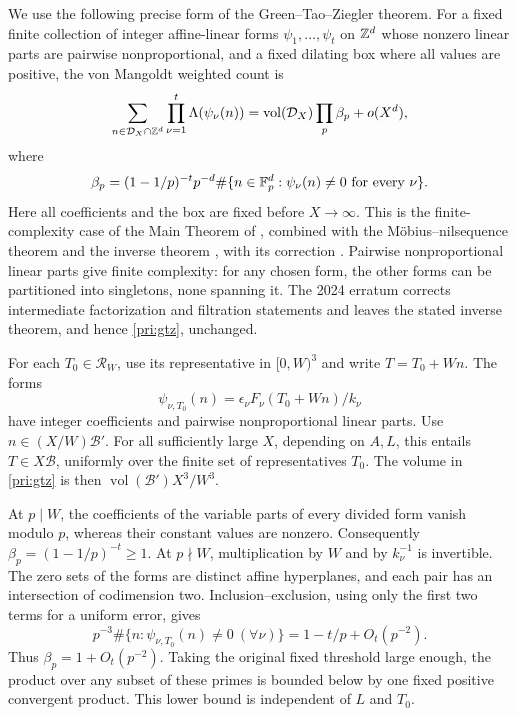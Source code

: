 We use the following precise form of the Green--Tao--Ziegler theorem.
For a fixed finite collection of integer affine-linear forms
$\psi_1,\ldots,\psi_t$ on $\mathbb Z^d$ whose nonzero linear parts are pairwise
nonproportional, and a fixed dilating box where all values are positive,
the von Mangoldt weighted count is
\begin{equation}\label{pri:gtz}
 \sum_{n\in\mathcal D_X\cap\mathbb Z^d}\prod_{\nu=1}^t\Lambda(\psi_\nu(n))
 =\operatorname{vol}(\mathcal D_X)\prod_p\beta_p+o(X^d),
\end{equation}
where
\[
 \beta_p=(1-1/p)^{-t}p^{-d}
   \#\{n\in\mathbb F_p^d:\psi_\nu(n)\ne0\text{ for every }\nu\}.
\]
Here all coefficients and the box are fixed before $X\to\infty$.
This is the finite-complexity case of the Main Theorem of
\cite{GreenTao2010}, combined with the M\"obius--nilsequence theorem
\cite[Theorem 1.1]{GreenTao2012} and the inverse theorem
\cite[Theorem 1.3]{GreenTaoZiegler2012}, with its correction
\cite{GreenTaoZiegler2024Erratum}.  Pairwise nonproportional linear parts
give finite complexity: for any chosen form, the other forms can be
partitioned into singletons, none spanning it.  The 2024 erratum
corrects intermediate factorization and filtration statements and leaves
the stated inverse theorem, and hence \eqref{pri:gtz}, unchanged.

For each $T_0\in\mathcal R_W$, use its representative in $[0,W)^3$ and
write $T=T_0+Wn$.  The forms
\[
             \psi_{\nu,T_0}(n)
              =\epsilon_\nu F_\nu(T_0+Wn)/k_\nu
\]
have integer coefficients and pairwise nonproportional linear parts.
Use $n\in(X/W)\mathcal B'$.  For all sufficiently large $X$, depending
on $A,L$, this entails $T\in X\mathcal B$, uniformly over the finite
set of representatives $T_0$.  The volume in \eqref{pri:gtz} is then
$\operatorname{vol}(\mathcal B')X^3/W^3$.

At $p\mid W$, the coefficients of the variable parts of every divided
form vanish modulo $p$, whereas their constant values are nonzero.
Consequently $\beta_p=(1-1/p)^{-t}\ge1$.  At $p\nmid W$, multiplication
by $W$ and by $k_\nu^{-1}$ is invertible.  The zero sets of the forms
are distinct affine hyperplanes, and each pair has an intersection of
codimension two.  Inclusion--exclusion, using only the first two terms
for a uniform error, gives
\[
        p^{-3}\#\{n:\psi_{\nu,T_0}(n)\ne0\ (\forall\nu)\}
                            =1-t/p+O_t(p^{-2}).
\]
Thus $\beta_p=1+O_t(p^{-2})$.  Taking the original fixed threshold
large enough, the product over any subset of these primes is bounded
below by one fixed positive convergent product.  This lower bound is
independent of $L$ and $T_0$.

